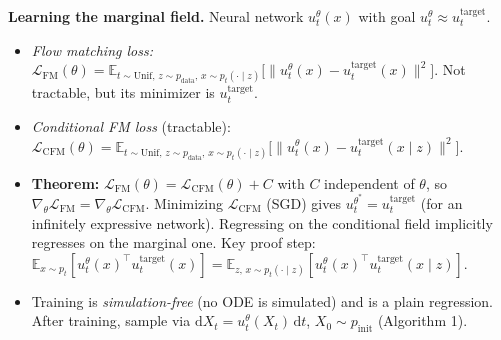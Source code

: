 \documentclass{article}
\newcommand{\E}{\mathbb{E}}
\newcommand{\pinit}{p_{\mathrm{init}}}
\newcommand{\pdata}{p_{\mathrm{data}}}
\newcommand{\uth}{u_t^{\theta}}
\newcommand{\utar}{u_t^{\mathrm{target}}}
\newcommand{\dd}{\mathrm{d}}
\newcommand{\Unif}{\mathrm{Unif}}
\begin{document}
\textbf{Learning the marginal field.} Neural network $\uth(x)$ with goal $\uth\approx\utar$.
\begin{itemize}
  \item \emph{Flow matching loss:}
  $\mathcal L_{\mathrm{FM}}(\theta)=\E_{t\sim\Unif,\,z\sim\pdata,\,x\sim p_t(\cdot\mid z)}\big[\|\uth(x)-\utar(x)\|^2\big]$. Not tractable, but its minimizer is $\utar$.
  \item \emph{Conditional FM loss} (tractable):
  $\mathcal L_{\mathrm{CFM}}(\theta)=\E_{t\sim\Unif,\,z\sim\pdata,\,x\sim p_t(\cdot\mid z)}\big[\|\uth(x)-\utar(x\mid z)\|^2\big]$.
  \item \textbf{Theorem:} $\mathcal L_{\mathrm{FM}}(\theta)=\mathcal L_{\mathrm{CFM}}(\theta)+C$ with $C$ independent of $\theta$, so $\nabla_\theta\mathcal L_{\mathrm{FM}}=\nabla_\theta\mathcal L_{\mathrm{CFM}}$. Minimizing $\mathcal L_{\mathrm{CFM}}$ (SGD) gives $u_t^{\theta^*}=\utar$ (for an infinitely expressive network). Regressing on the conditional field implicitly regresses on the marginal one. Key proof step: $\E_{x\sim p_t}[\uth(x)^\top\utar(x)]=\E_{z,\,x\sim p_t(\cdot\mid z)}[\uth(x)^\top\utar(x\mid z)]$.
  \item Training is \emph{simulation-free} (no ODE is simulated) and is a plain regression. After training, sample via $\dd X_t=\uth(X_t)\,\dd t$, $X_0\sim\pinit$ (Algorithm 1).
\end{itemize}
\end{document}
